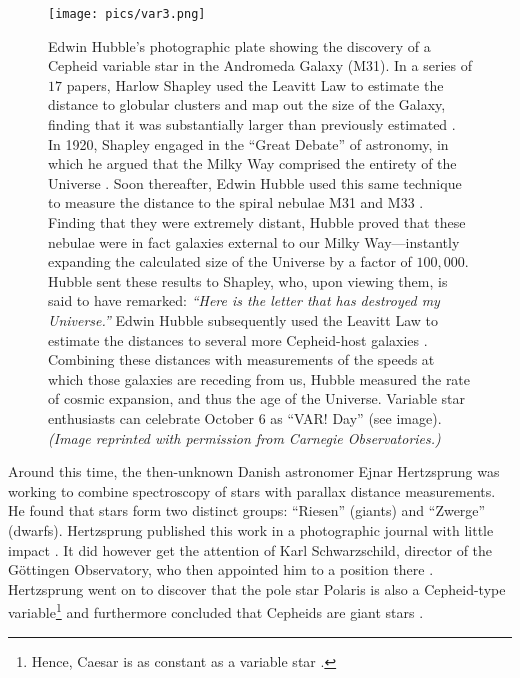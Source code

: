 \begin{figure}
    \centering
    \texttt{[image: pics/var3.png]}
    \caption[VAR! Day]{Edwin Hubble's photographic plate showing the discovery of a Cepheid variable star in the Andromeda Galaxy (M31). 
    In a series of $17$ papers, Harlow Shapley used the Leavitt Law to estimate the distance to globular clusters and map out the size of the Galaxy, finding that it was substantially larger than previously estimated \citep{1918ApJ....48...89S}. 
    In 1920, Shapley engaged in the ``Great Debate'' of astronomy, in which he argued that the Milky Way comprised the entirety of the Universe \citep{1921BuNRC...2..171S}. 
    Soon thereafter, Edwin Hubble used this same technique to measure the distance to the spiral nebulae M31 and M33 \citep[][see image]{1925Obs....48..139H}. 
    Finding that they were extremely distant, Hubble proved that these nebulae were in fact galaxies external to our Milky Way---instantly expanding the calculated size of the Universe by a factor of $100,000$. 
    Hubble sent these results to Shapley, who, upon viewing them, is said to have remarked: \emph{``Here is the letter that has destroyed my Universe.''} 
    Edwin Hubble subsequently used the Leavitt Law to estimate the distances to several more Cepheid-host galaxies \citep{1929PNAS...15..168H}. 
    Combining these distances with measurements of the speeds at which those galaxies are receding from us, Hubble measured the rate of cosmic expansion, and thus the age of the Universe. 
    Variable star enthusiasts can celebrate October 6 as ``VAR! Day'' (see image). 
    \emph{(Image reprinted with permission from Carnegie Observatories.)}
    \label{fig:var-day}}
\end{figure}

Around this time, the then-unknown Danish astronomer Ejnar Hertzsprung was working to combine spectroscopy of stars with parallax distance measurements. 
He found that stars form two distinct groups: ``Riesen'' (giants) and ``Zwerge'' (dwarfs). 
Hertzsprung published this work in a photographic journal with little impact \citep{1905WisZP...3..442H, 1907WisZP...5...86H}. 
It did however get the attention of Karl Schwarzschild, director of the G\"ottingen Observatory, who then appointed him to a position there \citep[e.g.,][]{bolt2007biographical}. 
Hertzsprung went on to discover that the pole star Polaris is also a Cepheid-type variable\footnote{ Hence, Caesar is as constant as a variable star \citep{shakespeare}.} \citep{1911AN....189...89H} and furthermore concluded that Cepheids are giant stars \citep{1913AN....196..201H}. 

